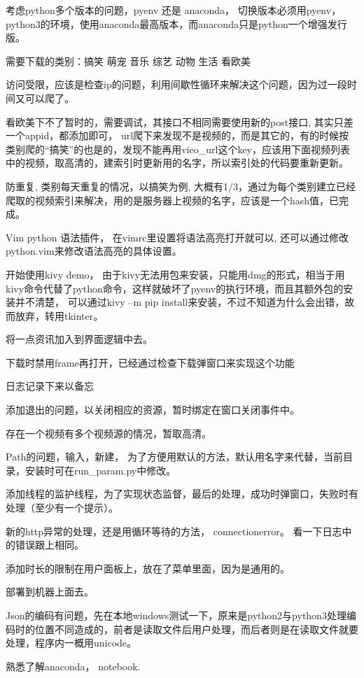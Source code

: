 \documentclass[11pt]{article}
\begin{document}
考虑python多个版本的问题，pyenv 还是 anaconda， 切换版本必须用pyenv，
python3的环境，使用anaconda最高版本，而anaconda只是python一个增强发行版。

需要下载的类别：搞笑 萌宠 音乐 综艺 动物 生活 看欧美

访问受限，应该是检查ip的问题，利用间歇性循环来解决这个问题，因为过一段时间又可以爬了。

看欧美下不了暂时的，需要调试，其接口不相同需要使用新的post接口,
其实只差一个appid，都添加即可，
url爬下来发现不是视频的，而是其它的，有的时候按类别爬的``搞笑''的也是的，发现不能再用vieo\_url这个key，应该用下面视频列表中的视频，取高清的，建索引时更新用的名字，所以索引处的代码要重新更新。

防重复, 类别每天重复的情况，以搞笑为例,
大概有1/3，通过为每个类别建立已经爬取的视频索引来解决，用的是服务器上视频的名字，应该是一个hash值，已完成。

Vim python 语法插件， 在vimrc里设置将语法高亮打开就可以,
还可以通过修改python.vim来修改语法高亮的具体设置。

开始使用kivy demo，
由于kivy无法用包来安装，只能用dmg的形式，相当于用kivy命令代替了python命令，这样就破坏了pyenv的执行环境，而且其额外包的安装并不清楚，
可以通过kivy --m pip
install来安装，不过不知道为什么会出错，故而放弃，转用tkinter。

将一点资讯加入到界面逻辑中去。

下载时禁用frame再打开，已经通过检查下载弹窗口来实现这个功能

日志记录下来以备忘

添加退出的问题，以关闭相应的资源，暂时绑定在窗口关闭事件中。

存在一个视频有多个视频源的情况，暂取高清。

Path的问题，输入，新建，
为了方便用默认的方法，默认用名字来代替，当前目录，安装时可在run\_param.py中修改。

添加线程的监护线程，为了实现状态监督，最后的处理，成功时弹窗口，失败时有处理（至少有一个提示）。

新的http异常的处理，还是用循环等待的方法， connectionerror。
看一下日志中的错误跟上相同。

添加时长的限制在用户面板上，放在了菜单里面，因为是通用的。

部署到机器上面去。

Json的编码有问题，先在本地windows测试一下，原来是python2与python3处理编码时的位置不同造成的，前者是读取文件后用户处理，而后者则是在读取文件就要处理，程序内一概用unicode。

熟悉了解anaconda， notebook.
\end{document}
